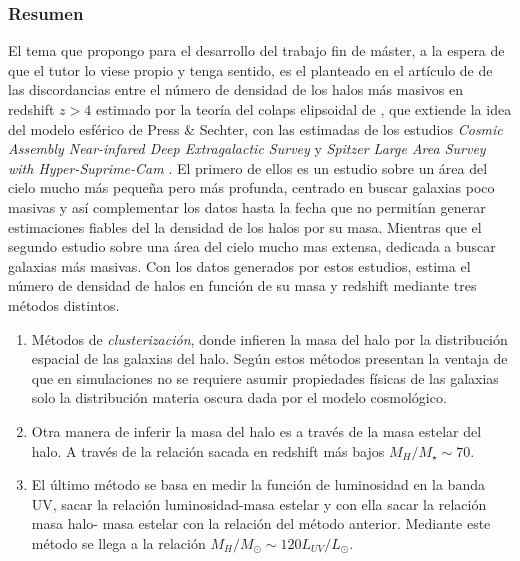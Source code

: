 \subsubsection*{Resumen}
El tema que propongo para el desarrollo del trabajo fin de máster, a la espera de que el tutor lo viese propio y tenga sentido, es el planteado en el artículo de \cite{steinhardt2016impossibly} de las discordancias entre el número de densidad de los halos más masivos en redshift $z>4$ estimado por la teoría del colaps elipsoidal de \cite{10.1046/j.1365-8711.2001.04006.x}, que extiende la idea del modelo esférico de Press \& Sechter,  con las estimadas de los estudios \textit{Cosmic Assembly Near-infared Deep Extragalactic Survey} \citep[CANDELS]{grogin2011candels} y \textit{Spitzer Large Area Survey with Hyper-Suprime-Cam} \citep[SPLASH]{capak2012splash}. El primero de ellos es un estudio sobre un área del cielo mucho más pequeña pero más profunda, centrado en buscar galaxias poco masivas y así complementar los datos hasta la fecha que no permitían generar estimaciones fiables del la densidad de los halos por su masa. Mientras que el segundo estudio sobre una área del cielo mucho mas extensa, dedicada a buscar galaxias más masivas. Con los datos generados por estos estudios, \cite{steinhardt2016impossibly} estima el número de densidad de halos en función de su masa y redshift mediante tres métodos distintos.
\begin{enumerate}
\item Métodos de \textit{clusterización}, donde infieren la masa del halo por la distribución espacial de las galaxias del halo. Según \cite{steinhardt2016impossibly} estos métodos presentan la ventaja de que en simulaciones no se requiere asumir propiedades físicas de las galaxias solo la distribución materia oscura dada por el modelo cosmológico. 
\item Otra manera de inferir la masa del halo es a través de la masa estelar del halo. A través de la relación sacada en redshift más bajos \citep{leauthaud2011new} $M_H/M_\star \sim 70$.
\item El último método se basa en medir la función de luminosidad en la banda UV, sacar la relación luminosidad-masa estelar y con ella sacar la relación masa halo- masa estelar con la relación del método anterior. Mediante este método se llega a la relación $M_H / M_\odot \sim 120L_{UV} / L_\odot$.
\end{enumerate}

